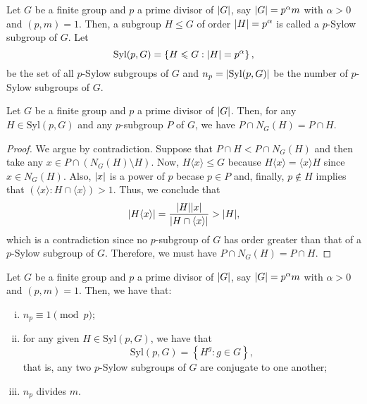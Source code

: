 \begin{definition}\label{def:p-sylow-subgroups}
  Let \(G\) be a finite group and \(p\) a prime divisor of \(\lvert G\rvert\), say \(\lvert G\rvert=p^{\alpha}m\) with \({\alpha}>{0}\) and \((p,m)=1\). Then, a subgroup \({H}\leqslant{G}\) of order \(\lvert H\rvert=p^{\alpha}\) is called a \(p\)-Sylow subgroup of \(G\). Let
  \[
    \text{Syl}(p,G)
    =
    \left\{{H}\leqslant{G}:\lvert H\rvert=p^{\alpha}\right\}
    ,
  \]
  be the set of all \(p\)-Sylow subgroups of \(G\) and \(n_{p}=\lvert\text{Syl}(p,G)\rvert\) be the number of \(p\)-Sylow subgroups of \(G\).
\end{definition}

\begin{lemma}\label{lem:normalizer-of-sylow-subgroups}
  Let \(G\) be a finite group and \(p\) a prime divisor of \(\lvert G\rvert\). Then, for any \({H}\in{\text{Syl}(p,G)}\) and any \(p\)-subgroup \(P\) of \(G\), we have \(P\cap{N_{G}(H)}=P\cap{H}\).
\end{lemma}

\begin{proof}
  We argue by contradiction. Suppose that \({P\cap{H}}<{P\cap{N_{G}(H)}}\) and then take any \({x}\in{P\cap{\left(N_{G}(H)\setminus{H}\right)}}\). Now, \({H\langle{x}\rangle}\leqslant{G}\) because \({H\langle{x}\rangle}=\langle{x}\rangle{H}\) since \({x}\in{N_{G}(H)}\). Also, \(\lvert x\rvert\) is a power of \(p\) becase \({p}\in{P}\) and, finally, \({p}\notin{H}\) implies that \({\left(\langle{x}\rangle:H\cap{\langle{x}\rangle}\right)}>{1}\). Thus, we conclude that
  \[
    \lvert H\langle{x}\rangle\rvert
    =
    \frac{\lvert H\rvert\lvert x\rvert}{\lvert H\cap{\langle{x}\rangle}\rvert}
    >
    \lvert H\rvert
    ,
  \]
  which is a contradiction since no \(p\)-subgroup of \(G\) has order greater than that of a \(p\)-Sylow subgroup of \(G\). Therefore, we must have \(P\cap{N_{G}(H)}=P\cap{H}\).
\end{proof}

\begin{theorem}\label{thm:second-sylow-theorem}
  Let \(G\) be a finite group and \(p\) a prime divisor of \(\lvert G\rvert\), say \(\lvert G\rvert=p^{\alpha}m\) with \({\alpha}>{0}\) and \((p,m)=1\). Then, we have that:
  \begin{enumerate}[i.]
    \item
      \(n_{p}\equiv{1}\pmod{p}\);
    \item
      for any given \({H}\in{\text{Syl}(p,G)}\), we have that
      \[
        \text{Syl}(p,G)
        =
        \left\{H^{g}:{g}\in{G}\right\}
        ,
      \]
      that is, any two \(p\)-Sylow subgroups of \(G\) are conjugate to one another;
    \item
      \(n_{p}\) divides \(m\).
  \end{enumerate}
\end{theorem}

